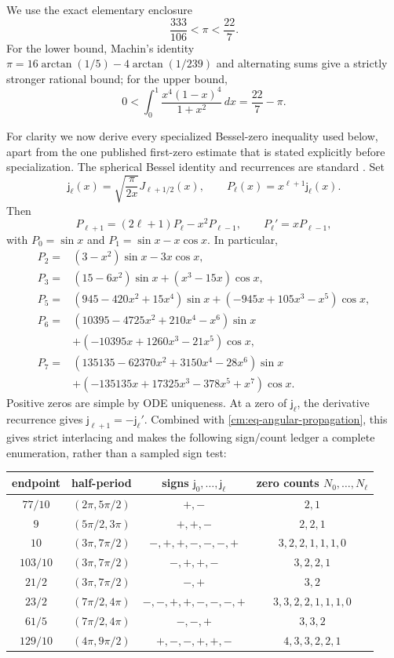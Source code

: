 \documentclass[11pt]{article}
\numberwithin{equation}{section}
\theoremstyle{definition}
\theoremstyle{remark}
\begin{document}
We use the exact elementary enclosure
\begin{equation}
 \frac{333}{106}<\pi<\frac{22}{7}.
 \label{cm:eq-pi}
\end{equation}
For the lower bound, Machin's identity
\(\pi=16\arctan(1/5)-4\arctan(1/239)\) and alternating sums give a
strictly stronger rational bound; for the upper bound,
\[
 0<\int_0^1\frac{x^4(1-x)^4}{1+x^2}\,dx=\frac{22}{7}-\pi.
\]

For clarity we now derive every specialized Bessel-zero inequality used
below, apart from the one published first-zero estimate that is stated
explicitly before specialization.  The spherical Bessel identity and
recurrences are standard \cite{DLMF}.  Set
\[
 \mathsf j_\ell(x)=\sqrt{\frac{\pi}{2x}}J_{\ell+1/2}(x),
 \qquad
 P_\ell(x)=x^{\ell+1}\mathsf j_\ell(x).
\]
Then
\begin{equation}
 P_{\ell+1}=(2\ell+1)P_\ell-x^2P_{\ell-1},
 \qquad P_\ell'=xP_{\ell-1},
 \label{cm:eq-P-recurrence}
\end{equation}
with \(P_0=\sin x\) and \(P_1=\sin x-x\cos x\).  In particular,
\[
\begin{aligned}
P_2={}&(3-x^2)\sin x-3x\cos x,\\
P_3={}&(15-6x^2)\sin x+(x^3-15x)\cos x,\\
P_5={}&(945-420x^2+15x^4)\sin x
       +(-945x+105x^3-x^5)\cos x,\\
P_6={}&(10395-4725x^2+210x^4-x^6)\sin x\\
 &+(-10395x+1260x^3-21x^5)\cos x,\\
P_7={}&(135135-62370x^2+3150x^4-28x^6)\sin x\\
 &+(-135135x+17325x^3-378x^5+x^7)\cos x.
\end{aligned}
\]
Positive zeros are simple by ODE uniqueness.  At a zero of
\(\mathsf j_\ell\), the derivative recurrence gives
\(\mathsf j_{\ell+1}=-\mathsf j_\ell'\).  Combined with
\eqref{cm:eq-angular-propagation}, this gives strict interlacing and makes
the following sign/count ledger a complete enumeration, rather than a
sampled sign test:
\begin{center}
\small
\begin{tabular}{c|c|c|c}
endpoint & half-period & signs \(\mathsf j_0,\ldots,\mathsf j_\ell\)
& zero counts \(N_0,\ldots,N_\ell\)\\ \hline
\(77/10\)&\((2\pi,5\pi/2)\)&\(+,-\)&\(2,1\)\\
\(9\)&\((5\pi/2,3\pi)\)&\(+,+,-\)&\(2,2,1\)\\
\(10\)&\((3\pi,7\pi/2)\)&\(-,+,+,-,-,-,+\)&\(3,2,2,1,1,1,0\)\\
\(103/10\)&\((3\pi,7\pi/2)\)&\(-,+,+,-\)&\(3,2,2,1\)\\
\(21/2\)&\((3\pi,7\pi/2)\)&\(-,+\)&\(3,2\)\\
\(23/2\)&\((7\pi/2,4\pi)\)&\(-,-,+,+,-,-,-,+\)&\(3,3,2,2,1,1,1,0\)\\
\(61/5\)&\((7\pi/2,4\pi)\)&\(-,-,+\)&\(3,3,2\)\\
\(129/10\)&\((4\pi,9\pi/2)\)&\(+,-,-,+,+,-\)&\(4,3,3,2,2,1\)
\end{tabular}
\end{center}
\end{document}
